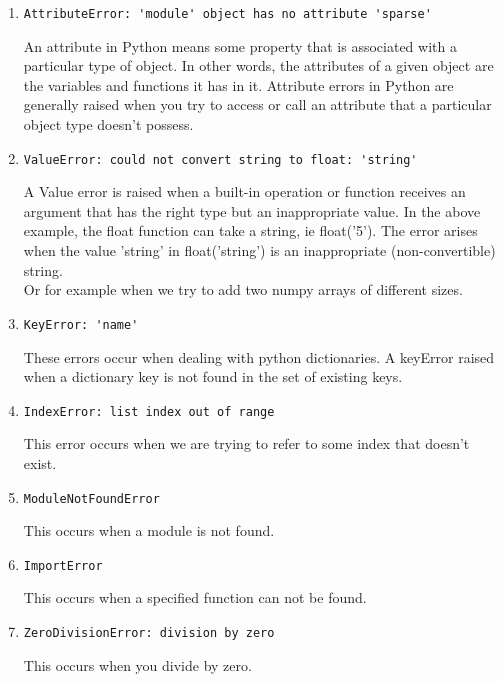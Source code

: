 \documentclass{article}
\begin{document}
\begin{enumerate}
    \item \begin{lstlisting}
AttributeError: 'module' object has no attribute 'sparse'
    \end{lstlisting}
    An attribute in Python means some property that is associated with a particular type of object. In other words, the attributes of a given object are the variables and functions it has in it. Attribute errors in Python are generally raised when you try to access or call an attribute that a particular object type doesn’t possess. 
    
    \item \begin{lstlisting}
ValueError: could not convert string to float: 'string'

    \end{lstlisting}
    A Value error is raised when a built-in operation or function receives an argument that has the right type but an inappropriate value. In the above example, the float function can take a string, ie float('5'). The error arises when the value 'string' in float('string') is an inappropriate (non-convertible) string. \\
    Or for example when we try to add two numpy arrays of different sizes.
    
    \item \begin{lstlisting}
KeyError: 'name'
    \end{lstlisting}
    These errors occur when dealing with python dictionaries. A keyError raised when a dictionary key is not found in the set of existing keys.
    
    \item \begin{lstlisting}
IndexError: list index out of range
    \end{lstlisting}
    This error occurs when we are trying to refer to some index that doesn't exist.
    
    \item \begin{lstlisting}
ModuleNotFoundError
    \end{lstlisting}
    This occurs when a module is not found.

\item \begin{lstlisting}
ImportError
\end{lstlisting}
This occurs when a specified function can not be found.

\item \begin{lstlisting}
ZeroDivisionError: division by zero
\end{lstlisting}
This occurs when you divide by zero.
\end{enumerate}
\end{document}

